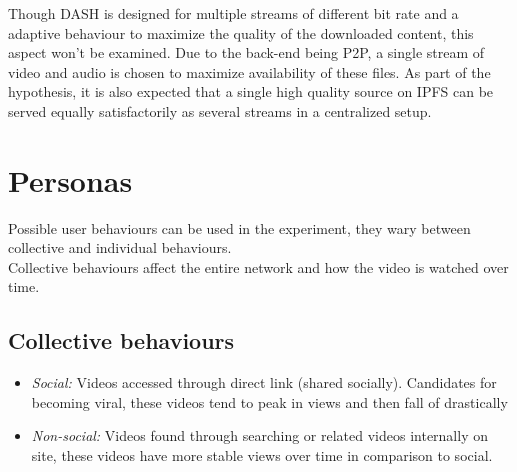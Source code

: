 Though \ac{DASH} is designed for multiple streams of different bit rate and a adaptive behaviour to maximize the quality of the downloaded content, this aspect won't be examined. Due to the back-end being \ac{P2P}, a single stream of video and audio is chosen to maximize availability of these files. As part of the hypothesis, it is also expected that a single high quality source on \ac{IPFS} can be served equally satisfactorily as several streams in a centralized setup.


\section{Personas}
\label{sec:des-persona}
Possible user behaviours can be used in the experiment, they wary between collective and individual behaviours.\\
Collective behaviours affect the entire network and how the video is watched over time.
\subsection{Collective behaviours}
\begin{itemize}
    \item \textit{Social:}
    Videos accessed through direct link (shared socially). Candidates for becoming viral, these videos tend to peak in views and then fall of drastically
    \item \textit{Non-social:}
    Videos found through searching or related videos internally on site, these videos have more stable views over time in comparison to social.
\end{itemize}

